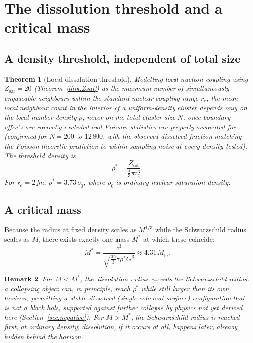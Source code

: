 \documentclass[12pt,a4paper]{article}
\newtheorem{theorem}{Theorem}[section]
\newtheorem{remark}[theorem]{Remark}
\newcommand{\Zsat}{Z_{\mathrm{sat}}}
\begin{document}
\section{The dissolution threshold and a critical mass}
\label{sec:threshold}

\subsection{A density threshold, independent of total size}

\begin{theorem}[Local dissolution threshold]
\label{thm:threshold}
Modelling local nucleon coupling using $\Zsat=20$
(Theorem~\ref{thm:Zsat}) as the maximum number of simultaneously
engageable neighbours within the standard nuclear coupling range
$r_c$, the mean local neighbour count in the interior of a
uniform-density cluster depends only on the local number density
$\rho$, never on the total cluster size $N$, once boundary effects
are correctly excluded and Poisson statistics are properly accounted
for (confirmed for $N=200$ to $12\,800$, with the observed
dissolved fraction matching the Poisson-theoretic prediction to
within sampling noise at every density tested). The threshold
density is
\begin{equation}
\rho^*=\frac{\Zsat}{\frac{4}{3}\pi r_c^3}.
\end{equation}
For $r_c=2\,$fm, $\rho^*=3.73\,\rho_0$, where $\rho_0$ is ordinary
nuclear saturation density.
\end{theorem}

\subsection{A critical mass}

Because the radius at fixed density scales as $M^{1/3}$ while the
Schwarzschild radius scales as $M$, there exists exactly one mass
$M^*$ at which these coincide:
\begin{equation}
M^*=\frac{c^3}{\sqrt{\tfrac{32}{3}\pi\rho^*G^3}}\approx4.31\,M_\odot.
\end{equation}

\begin{remark}
For $M<M^*$, the dissolution radius exceeds the Schwarzschild
radius: a collapsing object can, in principle, reach $\rho^*$ while
still larger than its own horizon, permitting a stable dissolved
(single coherent surface) configuration that is not a black hole,
supported against further collapse by physics not yet derived here
(Section~\ref{sec:negative}). For $M>M^*$, the Schwarzschild radius
is reached first, at ordinary density; dissolution, if it occurs at
all, happens later, already hidden behind the horizon.
\end{remark}
\end{document}
